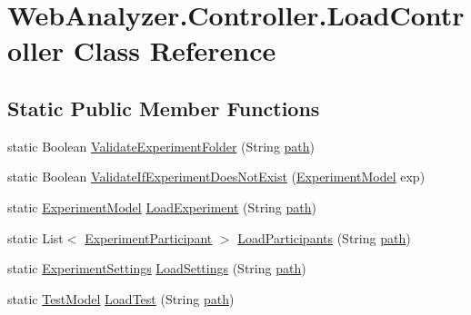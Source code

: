 \hypertarget{class_web_analyzer_1_1_controller_1_1_load_controller}{}\section{Web\+Analyzer.\+Controller.\+Load\+Controller Class Reference}
\label{class_web_analyzer_1_1_controller_1_1_load_controller}
\subsection*{Static Public Member Functions}
\begin{DoxyCompactItemize}
\item 
static Boolean \hyperlink{class_web_analyzer_1_1_controller_1_1_load_controller_a4ccfcc1eddcf758a1d9c3df334750a05}{Validate\+Experiment\+Folder} (String \hyperlink{_u_i_2_h_t_m_l_resources_2js_2src_2create__experiment_8js_aa72e0c8a20e6bcc571d3a1c51846e627}{path})
\item 
static Boolean \hyperlink{class_web_analyzer_1_1_controller_1_1_load_controller_a2cf58e1b4a77099dc5fa14f4743fcb16}{Validate\+If\+Experiment\+Does\+Not\+Exist} (\hyperlink{class_web_analyzer_1_1_models_1_1_base_1_1_experiment_model}{Experiment\+Model} exp)
\item 
static \hyperlink{class_web_analyzer_1_1_models_1_1_base_1_1_experiment_model}{Experiment\+Model} \hyperlink{class_web_analyzer_1_1_controller_1_1_load_controller_a49122060869d7d678c3f0518f70bbe04}{Load\+Experiment} (String \hyperlink{_u_i_2_h_t_m_l_resources_2js_2src_2create__experiment_8js_aa72e0c8a20e6bcc571d3a1c51846e627}{path})
\item 
static List$<$ \hyperlink{class_web_analyzer_1_1_models_1_1_base_1_1_experiment_participant}{Experiment\+Participant} $>$ \hyperlink{class_web_analyzer_1_1_controller_1_1_load_controller_adc9166c45bf2b2a3fe1b89dc72e539bc}{Load\+Participants} (String \hyperlink{_u_i_2_h_t_m_l_resources_2js_2src_2create__experiment_8js_aa72e0c8a20e6bcc571d3a1c51846e627}{path})
\item 
static \hyperlink{class_web_analyzer_1_1_models_1_1_settings_model_1_1_experiment_settings}{Experiment\+Settings} \hyperlink{class_web_analyzer_1_1_controller_1_1_load_controller_aac7916dc05a2869790dd010a8f5477d4}{Load\+Settings} (String \hyperlink{_u_i_2_h_t_m_l_resources_2js_2src_2create__experiment_8js_aa72e0c8a20e6bcc571d3a1c51846e627}{path})
\item 
static \hyperlink{class_web_analyzer_1_1_models_1_1_data_model_1_1_test_model}{Test\+Model} \hyperlink{class_web_analyzer_1_1_controller_1_1_load_controller_ac708d0fc98accf17574e97f1e59a7dc9}{Load\+Test} (String \hyperlink{_u_i_2_h_t_m_l_resources_2js_2src_2create__experiment_8js_aa72e0c8a20e6bcc571d3a1c51846e627}{path})
\end{DoxyCompactItemize}


